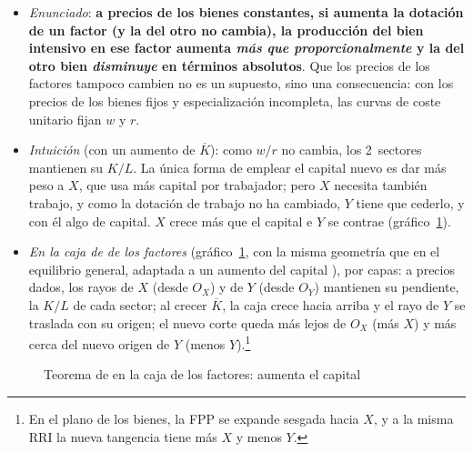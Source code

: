 \documentclass[11pt]{article}
\begin{document}
\begin{itemize}
\item \emph{Enunciado}: \textbf{a precios de los bienes constantes, si aumenta la dotación de un factor (y la del otro no cambia), la producción del bien intensivo en ese factor aumenta \emph{más que proporcionalmente} y la del otro bien \emph{disminuye} en términos absolutos}\nocite{Rybczynski1955Factor}. Que los precios de los factores tampoco cambien no es un supuesto, sino una consecuencia: con los precios de los bienes fijos y especialización incompleta, las curvas de coste unitario fijan $w$ y $r$.

\item \emph{Intuición} (con un aumento de $\overline K$): como $w/r$ no cambia, los 2~sectores mantienen su $K/L$. La única forma de emplear el capital nuevo es dar más peso a $X$, que usa más capital por trabajador; pero $X$ necesita también trabajo, y como la dotación de trabajo no ha cambiado, $Y$ tiene que cederlo, y con él algo de capital. $X$ crece más que el capital e $Y$ se contrae (gráfico~\ref{fig:rybczynski-caja}).
\item \emph{En la caja de  de los factores} (gráfico~\ref{fig:rybczynski-caja}, con la misma geometría que en el equilibrio general, adaptada a un aumento del capital ), por capas: a precios dados, los rayos de $X$ (desde $O_X$) y de $Y$ (desde $O_Y$) mantienen su pendiente, la $K/L$ de cada sector; al crecer $\overline K$, la caja crece hacia arriba y el rayo de $Y$ se traslada con su origen; el nuevo corte queda más lejos de $O_X$ (más $X$) y más cerca del nuevo origen de $Y$ (menos $Y$).\footnote{En el plano de los bienes, la FPP se expande sesgada hacia $X$, y a la misma RRI la nueva tangencia tiene más $X$ y menos $Y$.}
\end{itemize}
\begin{figure}[H]
\centering
\caption{Teorema de  en la caja de los factores: aumenta el capital}\label{fig:rybczynski-caja}
\end{figure}
\end{document}
